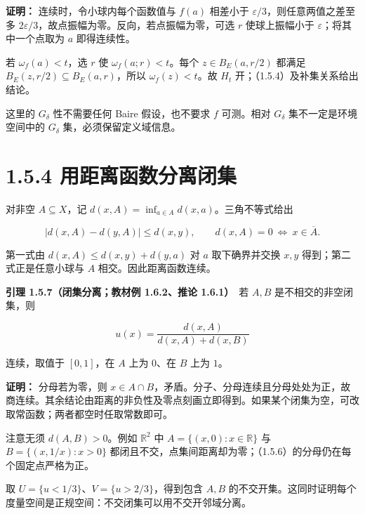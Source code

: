 \documentclass[11pt,a4paper]{article}
\begin{document}
\textbf{证明：} 连续时，令小球内每个函数值与 \(f(a)\) 相差小于
\(\varepsilon/3\)，则任意两值之差至多
\(2\varepsilon/3\)，故点振幅为零。反向，若点振幅为零，可选 \(r\)
使球上振幅小于 \(\varepsilon\)；将其中一个点取为 \(a\) 即得连续性。

若 \(\omega_f(a)<t\)，选 \(r\) 使 \(\omega_f(a;r)<t\)。每个
\(z\in B_E(a,r/2)\) 都满足 \(B_E(z,r/2)\subseteq B_E(a,r)\)，所以
\(\omega_f(z)<t\)。故 \(H_t\) 开；（1.5.4）及补集关系给出结论。

这里的 \(G_\delta\) 性不需要任何 Baire 假设，也不要求 \(f\) 可测。相对
\(G_\delta\) 集不一定是环境空间中的 \(G_\delta\)
集，必须保留定义域信息。

\section[\S{}1.5.4
用距离函数分离闭集]{1.5.4
用距离函数分离闭集}\label{ux7528ux8dddux79bbux51fdux6570ux5206ux79bbux95edux96c6}

对非空 \(A\subseteq X\)，记
\(d(x,A)=\inf_{a\in A}d(x,a)\)。三角不等式给出

\begin{equation*}
|d(x,A)-d(y,A)|\le d(x,y),\qquad
d(x,A)=0\ \Longleftrightarrow\ x\in\overline A.
\tag{1.5.5}
\end{equation*}

第一式由 \(d(x,A)\le d(x,y)+d(y,a)\) 对 \(a\) 取下确界并交换 \(x,y\)
得到；第二式正是任意小球与 \(A\) 相交。因此距离函数连续。

\textbf{引理 1.5.7（闭集分离；教材例 1.6.2、推论 1.6.1）}　若 \(A,B\)
是不相交的非空闭集，则

\begin{equation*}
u(x)=\frac{d(x,A)}{d(x,A)+d(x,B)}
\tag{1.5.6}
\end{equation*}

连续，取值于 \([0,1]\)，在 \(A\) 上为 \(0\)、在 \(B\) 上为 \(1\)。

\textbf{证明：} 分母若为零，则
\(x\in A\cap B\)，矛盾。分子、分母连续且分母处处为正，故商连续。其余结论由距离的非负性及零点刻画立即得到。如果某个闭集为空，可改取常函数；两者都空时任取常数即可。

注意无须 \(d(A,B)>0\)。例如 \(\mathbb R^2\) 中
\(A=\{(x,0):x\in\mathbb R\}\) 与 \(B=\{(x,1/x):x>0\}\)
都闭且不交，点集间距离却为零；（1.5.6）的分母仍在每个固定点严格为正。

取 \(U=\{u<1/3\}\)、\(V=\{u>2/3\}\)，得到包含 \(A,B\)
的不交开集。这同时证明每个度量空间是正规空间：不交闭集可以用不交开邻域分离。
\end{document}
